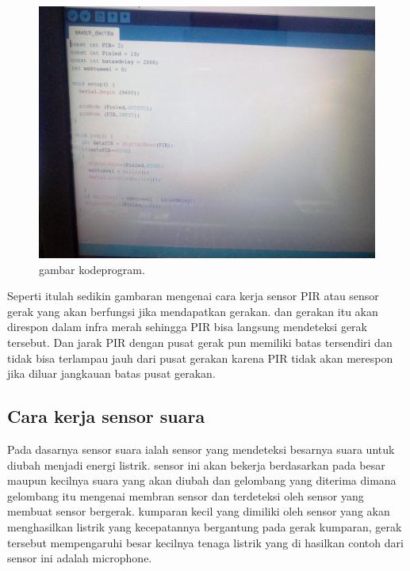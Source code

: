 \documentclass{article}
\begin{document}
\begin{figure}[ht]
\centerline{\includegraphics[width=1\textwidth]{figures/kodeprogram.JPG}}
\caption{gambar kodeprogram.}
\label{kodeprogram.JPG}
\end{figure}

Seperti itulah sedikin gambaran mengenai cara kerja sensor PIR atau sensor gerak yang akan berfungsi jika mendapatkan gerakan. dan gerakan itu akan direspon dalam infra merah sehingga PIR bisa langsung mendeteksi gerak tersebut. Dan jarak PIR dengan pusat gerak pun memiliki batas tersendiri dan tidak bisa terlampau jauh dari pusat gerakan karena PIR tidak akan merespon jika diluar jangkauan batas pusat gerakan.

\subsection {Cara kerja sensor suara}

Pada dasarnya sensor suara ialah sensor yang mendeteksi besarnya suara untuk diubah menjadi energi listrik. sensor ini akan bekerja berdasarkan pada besar maupun kecilnya suara yang akan diubah dan gelombang yang diterima dimana gelombang itu mengenai membran sensor dan terdeteksi oleh sensor yang membuat sensor bergerak. kumparan kecil yang dimiliki oleh sensor yang akan menghasilkan listrik yang kecepatannya bergantung pada gerak kumparan, gerak tersebut mempengaruhi besar kecilnya tenaga listrik yang di hasilkan contoh dari sensor ini adalah microphone.
\end{document}
